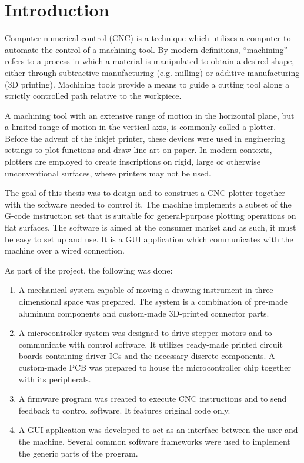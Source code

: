 \clearpage
\section{Introduction}

Computer numerical control (CNC) is a technique which utilizes a computer to
automate the control of a machining tool. By modern definitions, ``machining''
refers to a process in which a material is manipulated to obtain a desired
shape, either through subtractive manufacturing (e.g. milling) or additive
manufacturing (3D printing). Machining tools provide a means to guide a cutting
tool along a strictly controlled path relative to the workpiece.

A machining tool with an extensive range of motion in the horizontal plane, but
a limited range of motion in the vertical axis, is commonly called a plotter.
Before the advent of the inkjet printer, these devices were used in engineering
settings to plot functions and draw line art on paper. In modern contexts,
plotters are employed to create inscriptions on rigid, large or otherwise
unconventional surfaces, where printers may not be used.

The goal of this thesis was to design and to construct a CNC plotter together
with the software needed to control it. The machine implements a subset of the
G-code instruction set that is suitable for general-purpose plotting operations
on flat surfaces. The software is aimed at the consumer market and as such, it
must be easy to set up and use. It is a GUI application which communicates with
the machine over a wired connection.

As part of the project, the following was done:
\begin{enumerate}
    \item A mechanical system capable of moving a drawing instrument in
    three-dimensional space was prepared. The system is a combination of
    pre-made aluminum components and custom-made 3D-printed connector parts.
    \item A microcontroller system was designed to drive stepper motors and to
    communicate with control software. It utilizes ready-made printed circuit
    boards containing driver ICs and the necessary discrete components. A
    custom-made PCB was prepared to house the microcontroller chip together
    with its peripherals.
    \item A firmware program was created to execute CNC instructions and to send
    feedback to control software. It features original code only.
    \item A GUI application was developed to act as an interface between the
    user and the machine. Several common software frameworks were used to
    implement the generic parts of the program.
\end{enumerate}

